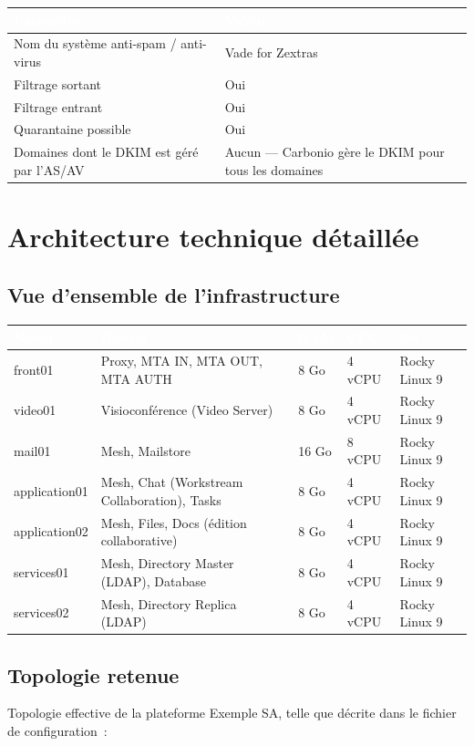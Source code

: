 \documentclass[11pt,a4paper]{report}
\newcommand{\tblhead}[1]{\textcolor{white}{\textbf{#1}}}
\begin{document}
\begin{longtable}{|p{7cm}|p{6cm}|}
\hline
\rowcolor{primary}\tblhead{Paramètre} & \tblhead{Valeur} \\
\hline
\endhead
Nom du système anti-spam / anti-virus & Vade for Zextras \\
\hline
Filtrage sortant & Oui \\
\hline
Filtrage entrant & Oui \\
\hline
Quarantaine possible & Oui \\
\hline
Domaines dont le DKIM est géré par l'AS/AV & Aucun --- Carbonio gère le DKIM pour tous les domaines \\
\hline
\end{longtable}

\chapter{Architecture technique détaillée}
\label{sec:archi-detaillee}

\section{Vue d'ensemble de l'infrastructure}
\begin{longtable}{|p{2.6cm}|p{5cm}|p{1.6cm}|p{1.6cm}|p{2.7cm}|}
\hline
\rowcolor{primary}\tblhead{Nœud} & \tblhead{Rôle(s)} & \tblhead{RAM} & \tblhead{CPU} & \tblhead{OS} \\
\hline
\endhead
front01 & Proxy, MTA IN, MTA OUT, MTA AUTH & 8 Go & 4 vCPU & Rocky Linux 9 \\
\hline
video01 & Visioconférence (Video Server) & 8 Go & 4 vCPU & Rocky Linux 9 \\
\hline
mail01 & Mesh, Mailstore & 16 Go & 8 vCPU & Rocky Linux 9 \\
\hline
application01 & Mesh, Chat (Workstream Collaboration), Tasks & 8 Go & 4 vCPU & Rocky Linux 9 \\
\hline
application02 & Mesh, Files, Docs (édition collaborative) & 8 Go & 4 vCPU & Rocky Linux 9 \\
\hline
services01 & Mesh, Directory Master (LDAP), Database & 8 Go & 4 vCPU & Rocky Linux 9 \\
\hline
services02 & Mesh, Directory Replica (LDAP) & 8 Go & 4 vCPU & Rocky Linux 9 \\
\hline
\end{longtable}

\clearpage
\section{Topologie retenue}
\label{sec:topologie}
Topologie effective de la plateforme Exemple SA, telle que décrite dans le fichier de configuration~:
\end{document}

